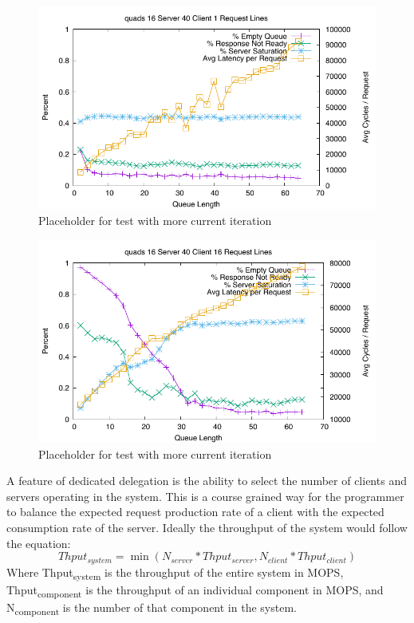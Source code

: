 \documentclass{uicthesi}
\begin{document}
\begin{figure}[ht!]
\centering
\includegraphics[width=0.9\columnwidth]{FIG/quads_client_saturation_1.pdf}
\caption{Placeholder for test with more current iteration}
\label{fig:saturation1RL}
\end{figure}

\begin{figure}[ht!]
\centering
\includegraphics[width=0.9\columnwidth]{FIG/quads_client_saturation_16.pdf}
\caption{Placeholder for test with more current iteration}
\label{fig:saturation16RL}
\end{figure}

A feature of dedicated delegation is the ability to select the number of clients and servers operating in the system. This is a course grained way for the programmer to balance the expected request production rate of a client with the expected consumption rate of the server. Ideally the throughput of the system would follow the equation: 
\begin{displaymath}
Thput_{system} = \min(N_{server} * Thput_{server}, N_{client} * Thput_{client})
\end{displaymath}
Where Thput\textsubscript{system} is the throughput of the entire system in MOPS, Thput\textsubscript{component} is the throughput of an individual component in MOPS, and N\textsubscript{component} is the number of that component in the system.  
\end{document}
